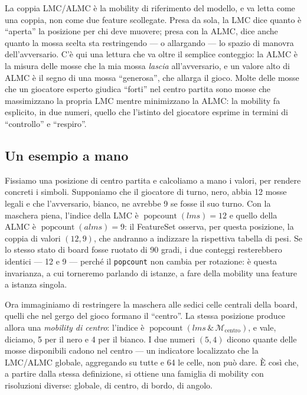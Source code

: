 La coppia LMC/ALMC è la mobility di riferimento del modello, e va letta come una
coppia, non come due feature scollegate. Presa da sola, la LMC dice quanto è
``aperta'' la posizione per chi deve muovere; presa con la ALMC, dice anche quanto la
mossa scelta sta restringendo --- o allargando --- lo spazio di manovra
dell'avversario. C'è qui una lettura che va oltre il semplice conteggio: la ALMC è la
misura delle mosse che la mia mossa \textit{lascia} all'avversario, e un valore alto
di ALMC è il segno di una mossa ``generosa'', che allarga il gioco. Molte delle mosse
che un giocatore esperto giudica ``forti'' nel centro partita sono mosse che
massimizzano la propria LMC mentre minimizzano la ALMC: la mobility fa esplicito, in
due numeri, quello che l'istinto del giocatore esprime in termini di ``controllo'' e
``respiro''.

\subsection{Un esempio a mano}

Fissiamo una posizione di centro partita e calcoliamo a mano i valori, per rendere
concreti i simboli. Supponiamo che il giocatore di turno, nero, abbia 12 mosse legali
e che l'avversario, bianco, ne avrebbe 9 se fosse il suo turno. Con la maschera piena,
l'indice della LMC è $\operatorname{popcount}(lms) = 12$ e quello della ALMC è
$\operatorname{popcount}(alms) = 9$: il FeatureSet osserva, per questa posizione, la
coppia di valori $(12, 9)$, che andranno a indizzare la rispettiva tabella di pesi.
Se lo stesso stato di board fosse ruotato di 90 gradi, i due conteggi resterebbero
identici --- 12 e 9 --- perché il \texttt{popcount} non cambia per rotazione: è questa
invarianza, a cui torneremo parlando di istanze, a fare della mobility una feature a
istanza singola.

Ora immaginiamo di restringere la maschera alle sedici celle centrali della board,
quelli che nel gergo del gioco formano il ``centro''. La stessa posizione produce
allora una \textit{mobility di centro}: l'indice è $\operatorname{popcount}(lms \,\&\,
\mathcal{M}_{\text{centro}})$, e vale, diciamo, 5 per il nero e 4 per il bianco. I due
numeri $(5, 4)$ dicono quante delle mosse disponibili cadono nel centro --- un
indicatore localizzato che la LMC/ALMC globale, aggregando su tutte e 64 le celle,
non può dare. È così che, a partire dalla stessa definizione, si ottiene una famiglia
di mobility con risoluzioni diverse: globale, di centro, di bordo, di angolo.


